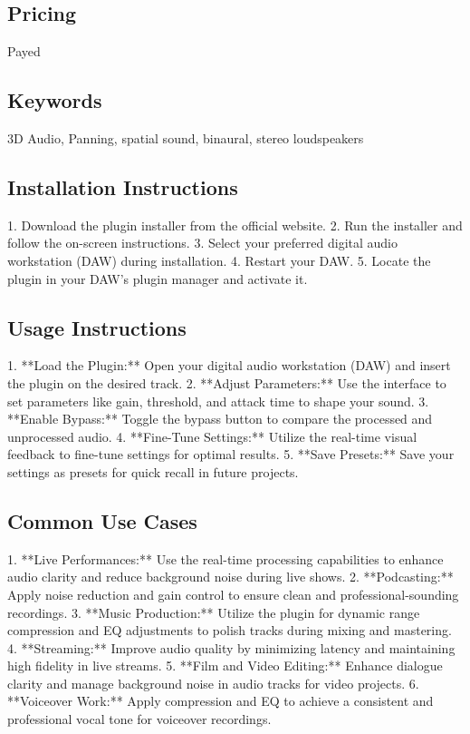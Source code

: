 \documentclass[8pt]{article}
\begin{document}
{{{{    \subsection*{Pricing}
    Payed

    \subsection*{Keywords}
    3D Audio, Panning, spatial sound, binaural, stereo loudspeakers

    \subsection*{Installation Instructions}
    1. Download the plugin installer from the official website.
2. Run the installer and follow the on-screen instructions.
3. Select your preferred digital audio workstation (DAW) during installation.
4. Restart your DAW.
5. Locate the plugin in your DAW’s plugin manager and activate it.

    \subsection*{Usage Instructions}
    1. **Load the Plugin:** Open your digital audio workstation (DAW) and insert the plugin on the desired track.
2. **Adjust Parameters:** Use the interface to set parameters like gain, threshold, and attack time to shape your sound.
3. **Enable Bypass:** Toggle the bypass button to compare the processed and unprocessed audio.
4. **Fine-Tune Settings:** Utilize the real-time visual feedback to fine-tune settings for optimal results.
5. **Save Presets:** Save your settings as presets for quick recall in future projects.

    \subsection*{Common Use Cases}
    1. **Live Performances:** Use the real-time processing capabilities to enhance audio clarity and reduce background noise during live shows.
2. **Podcasting:** Apply noise reduction and gain control to ensure clean and professional-sounding recordings.
3. **Music Production:** Utilize the plugin for dynamic range compression and EQ adjustments to polish tracks during mixing and mastering.
4. **Streaming:** Improve audio quality by minimizing latency and maintaining high fidelity in live streams.
5. **Film and Video Editing:** Enhance dialogue clarity and manage background noise in audio tracks for video projects.
6. **Voiceover Work:** Apply compression and EQ to achieve a consistent and professional vocal tone for voiceover recordings.

}}}}
\end{document}
